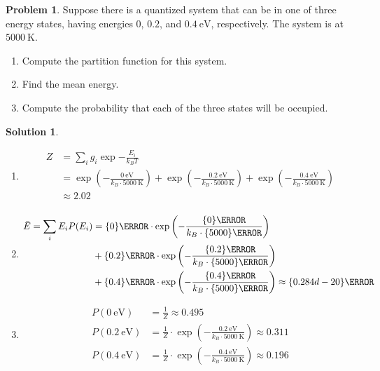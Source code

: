 \documentclass[10pt]{article}
\theoremstyle{definition}
\newtheorem{problem}{Problem}
\newtheorem{soln}{Solution}
\begin{document}
\begin{problem}
Suppose there is a quantized system that can be in one of three energy states, having energies $0$, $0.2$,
and $\qty{0.4}{\electronvolt}$, respectively. The system is at $\qty{5000}{\kelvin}$.
\begin{enumerate}[label=(\alph*)]
  \item Compute the partition function for this system.
  \item Find the mean energy.
  \item Compute the probability that each of the three states will be occupied.
\end{enumerate}
\end{problem}
\begin{soln}~
  \begin{enumerate}[label=(\alph*)]
    \item \begin{align*}
            Z & =\sum_{i}g_i\exp{-\frac{E_i}{k_BT}}                                            \\
              & =\exp\left(-\frac{\qty{0}{\electronvolt}}{k_B\cdot\qty{5000}{\kelvin}}\right)+
            \exp\left(-\frac{\qty{0.2}{\electronvolt}}{k_B\cdot\qty{5000}{\kelvin}}\right)+
            \exp\left(-\frac{\qty{0.4}{\electronvolt}}{k_B\cdot\qty{5000}{\kelvin}}\right)     \\
              & \approx 2.02                                                                   \\
          \end{align*}
    \item \begin{align*}
            \bar{E}  =\sum_{i}E_iP(E_i) & =
            \qty{0}{\electronvolt}\cdot\exp\left(-\frac{\qty{0}{\electronvolt}}{k_B\cdot\qty{5000}{\kelvin}}\right)                                                                         \\
                                        & +\qty{0.2}{\electronvolt}\cdot\exp\left(-\frac{\qty{0.2}{\electronvolt}}{k_B\cdot\qty{5000}{\kelvin}}\right)                                      \\
                                        & +\qty{0.4}{\electronvolt}\cdot\exp\left(-\frac{\qty{0.4}{\electronvolt}}{k_B\cdot\qty{5000}{\kelvin}}\right)\approx\qty{0.284d-20}{\electronvolt}
          \end{align*}
    \item \begin{align*}
            P(\qty{0}{\electronvolt})   & =\frac{1}{Z} \approx 0.495                                \\
            P(\qty{0.2}{\electronvolt}) & =
            \frac{1}{Z}\cdot\exp
            \left(-\frac{\qty{0.2}{\electronvolt}}{k_B\cdot\qty{5000}{\kelvin}}\right)\approx 0.311 \\
            P(\qty{0.4}{\electronvolt}) & =
            \frac{1}{Z}\cdot\exp
            \left(-\frac{\qty{0.4}{\electronvolt}}{k_B\cdot\qty{5000}{\kelvin}}\right)\approx 0.196
          \end{align*}
  \end{enumerate}
\end{soln}
\end{document}
